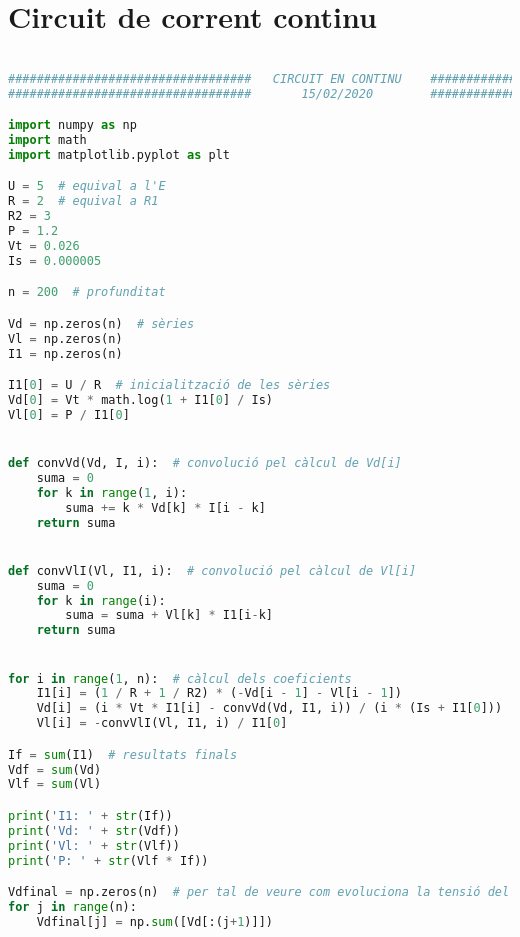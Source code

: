 \section{Circuit de corrent continu}
\begin{lstlisting}[language=Python,numbers=none]

##################################   CIRCUIT EN CONTINU    ###################################
##################################       15/02/2020        ###################################

import numpy as np
import math
import matplotlib.pyplot as plt

U = 5  # equival a l'E
R = 2  # equival a R1
R2 = 3
P = 1.2
Vt = 0.026
Is = 0.000005

n = 200  # profunditat

Vd = np.zeros(n)  # sèries
Vl = np.zeros(n)
I1 = np.zeros(n)

I1[0] = U / R  # inicialització de les sèries
Vd[0] = Vt * math.log(1 + I1[0] / Is)
Vl[0] = P / I1[0]


def convVd(Vd, I, i):  # convolució pel càlcul de Vd[i]
    suma = 0
    for k in range(1, i):
        suma += k * Vd[k] * I[i - k]
    return suma


def convVlI(Vl, I1, i):  # convolució pel càlcul de Vl[i]
    suma = 0
    for k in range(i):
        suma = suma + Vl[k] * I1[i-k]
    return suma


for i in range(1, n):  # càlcul dels coeficients
    I1[i] = (1 / R + 1 / R2) * (-Vd[i - 1] - Vl[i - 1])
    Vd[i] = (i * Vt * I1[i] - convVd(Vd, I1, i)) / (i * (Is + I1[0]))
    Vl[i] = -convVlI(Vl, I1, i) / I1[0]

If = sum(I1)  # resultats finals
Vdf = sum(Vd)
Vlf = sum(Vl)

print('I1: ' + str(If))
print('Vd: ' + str(Vdf))
print('Vl: ' + str(Vlf))
print('P: ' + str(Vlf * If))

Vdfinal = np.zeros(n)  # per tal de veure com evoluciona la tensió del díode
for j in range(n):
    Vdfinal[j] = np.sum([Vd[:(j+1)]])
    
\end{lstlisting}

